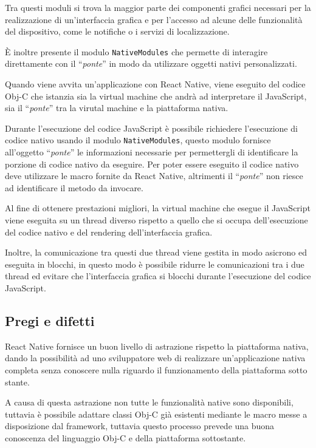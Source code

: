 Tra questi moduli si trova la maggior parte dei componenti grafici necessari per la realizzazione di un'interfaccia grafica e per l'accesso ad alcune delle funzionalità del dispositivo, come le notifiche o i servizi di localizzazione. 

\`E inoltre presente il modulo \texttt{NativeModules} che permette di interagire direttamente con il ``\textit{ponte}'' in modo da utilizzare oggetti nativi personalizzati.

Quando viene avvita un'applicazione con React Native, viene eseguito del codice Obj-C che istanzia sia la virtual machine che andrà ad interpretare il JavaScript, sia il ``\textit{ponte}'' tra la virutal machine e la piattaforma nativa.

Durante l'esecuzione del codice JavaScript è possibile richiedere l'esecuzione di codice nativo usando il modulo \texttt{NativeModules}, questo modulo fornisce all'oggetto ``\textit{ponte}'' le informazioni necessarie per permettergli di identificare la porzione di codice nativo da eseguire.
Per poter essere eseguito il codice nativo deve utilizzare le macro fornite da React Native, altrimenti il ``\textit{ponte}'' non riesce ad identificare il metodo da invocare.

Al fine di ottenere prestazioni migliori, la virtual machine che esegue il JavaScript viene eseguita su un thread diverso rispetto a quello che si occupa dell'esecuzione del codice nativo e del rendering dell'interfaccia grafica.

Inoltre, la comunicazione tra questi due thread viene gestita in modo asicrono ed eseguita in blocchi, in questo modo è possibile ridurre le comunicazioni tra i due thread ed evitare che l'interfaccia grafica si blocchi durante l'esecuzione del codice JavaScript.

\subsection{Pregi e difetti}

React Native fornisce un buon livello di astrazione rispetto la piattaforma nativa, dando la possibilità ad uno sviluppatore web di realizzare un'applicazione nativa completa senza conoscere nulla riguardo il funzionamento della piattaforma sotto stante.

A causa di questa astrazione non tutte le funzionalità native sono disponibili, tuttavia è possibile adattare classi Obj-C già esistenti mediante le macro messe a disposizione dal framework, tuttavia questo processo prevede una buona conoscenza del linguaggio Obj-C e della piattaforma sottostante.

